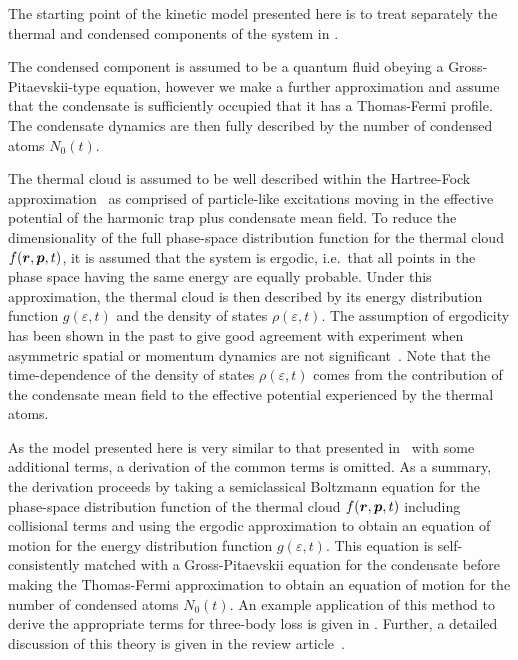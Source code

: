 \parasep

The starting point of the kinetic model presented here is to treat separately the thermal and condensed components of the system in .

The condensed component is assumed to be a quantum fluid obeying a Gross-Pitaevskii-type equation, however we make a further approximation and assume that the condensate is sufficiently occupied that it has a Thomas-Fermi profile.  The condensate dynamics are then fully described by the number of condensed atoms $N_0(t)$.

The thermal cloud is assumed to be well described within the Hartree-Fock approximation~\citep[Chapter 8]{PethickSmith} as comprised of particle-like excitations moving in the effective potential of the harmonic trap plus condensate mean field.  To reduce the dimensionality of the full phase-space distribution function for the thermal cloud $f(\bm{r}, \bm{p}, t)$, it is assumed that the system is ergodic, i.e.\  that all points in the phase space having the same energy are equally probable.  Under this approximation, the thermal cloud is then described by its energy distribution function $g(\varepsilon, t)$ and the density of states $\rho(\varepsilon, t)$.  The assumption of ergodicity has been shown in the past to give good agreement with experiment when asymmetric spatial or momentum dynamics are not significant~\citep{Bijlsma:2000,Davis:2000vn}.  Note that the time-dependence of the density of states $\rho(\varepsilon, t)$ comes from the contribution of the condensate mean field to the effective potential experienced by the thermal atoms.


As the model presented here is very similar to that presented in~\citep{Bijlsma:2000} with some additional terms, a derivation of the common terms is omitted. As a summary, the derivation proceeds by taking a semiclassical Boltzmann equation for the phase-space distribution function of the thermal cloud $f(\bm{r}, \bm{p}, t)$ including collisional terms and using the ergodic approximation to obtain an equation of motion for the energy distribution function $g(\varepsilon, t)$. This equation is self-consistently matched with a Gross-Pitaevskii equation for the condensate before making the Thomas-Fermi approximation to obtain an equation of motion for the number of condensed atoms $N_0(t)$. An example application of this method to derive the appropriate terms for three-body loss is given in . Further, a detailed discussion of this theory is given in the review article~\citep{Proukakis:2008}.

